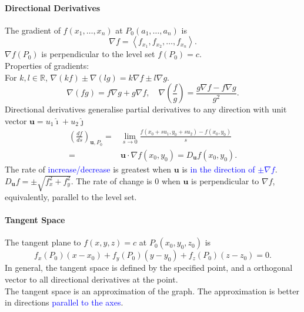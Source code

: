 \paragraph{Directional Derivatives}
The \textcolor{Bittersweet}{gradient} of $f\left( x_1,\ldots,x_{n} \right) $ at
$P_0\left( a_1,\ldots,a_{n} \right) $ is 
\[\nabla f=\left<f_{x_1},f_{x_2},\ldots,f_{x_{n}} \right>.\] 
$\nabla f\left( P_0 \right) $ is perpendicular to the level set
$f\left(P_0\right)=c$.\\
\textcolor{Bittersweet}{Properties} of gradients:\\
For $k,l\in \mathbb{R}$, $\nabla(kf)\pm \nabla(lg)=k\nabla f\pm l\nabla g$.
\[\nabla(fg)=f\nabla g+g\nabla f,\quad \nabla\left( \frac{f}{g} \right)
=\frac{g\nabla f-f\nabla g}{g^{2}}.\] 
\textcolor{Bittersweet}{Directional derivatives} generalise partial derivatives
to any direction with unit vector $\mathbf{u}=u_1 \hat{\imath}+u_2\hat{\jmath}$
\begin{align*}
  {\left( \frac{df}{ds} \right)}_{\mathbf{u},P_0} =&\lim_{s \to 0} \frac{f\left(
x_0+su_1,y_0+su_2 \right) -f\left( x_0,y_0 \right) }{s}\\
      =&\mathbf{u}\cdot \nabla f\left( x_0,y_0 \right)=D_\mathbf{u} f\left(
      x_0,y_0 \right).
\end{align*}
The rate of \textcolor{Blue}{increase/decrease} is greatest when $\mathbf{u}$
is \textcolor{Blue}{in the direction of $\pm\nabla f$}.
$D_\mathbf{u}f=\pm\sqrt{f_x^{2}+f_y^{2}}$. The rate of change is $0$ when
$\mathbf{u}$ is perpendicular to $\nabla f$, equivalently, parallel to the
level set.

\paragraph{Tangent Space}
The \textcolor{Bittersweet}{tangent plane} to $f\left( x,y,z \right) =c$ at
$P_0\left( x_0,y_0,z_0 \right) $ is
\[f_x\left( P_0 \right)\left( x-x_0 \right) +f_y\left( P_0 \right)\left(
y-y_0 \right) +f_z\left( P_0 \right) \left( z-z_0 \right)=0.\] 
In general, the \textcolor{Bittersweet}{tangent space} is defined by the
specified point, and a orthogonal vector to all directional derivatives at the
point.\\
The tangent space is an \textcolor{Bittersweet}{approximation of the graph}.
The approximation is better in directions \textcolor{Blue}{parallel to the
axes}.

